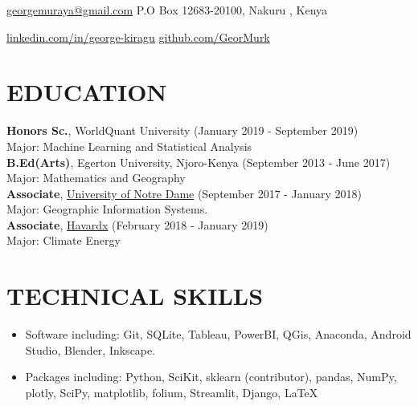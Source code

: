 \documentclass[line,margin,10pt]{res}
\begin{document}
 
\begin{resume}
\hoffset\centerline 
{\href{mailto:georgemuraya@gmail.com}{georgemuraya@gmail.com} \quad \quad \quad \quad \quad \quad \quad \quad \quad \quad \quad\quad \quad \quad \quad \quad \quad \quad \quad \quad \quad \quad  \quad    P.O Box 12683-20100, Nakuru , Kenya}
\hoffset\centerline 
{\hspace{0.05cm} \href{https://linkedin.com/in/george-kiragu}{linkedin.com/in/george-kiragu} \quad \quad \quad \quad \quad \quad \quad \quad \quad \quad \quad\quad \quad \quad \quad \quad \quad \quad \quad \quad \quad \quad  \quad \quad \quad  \quad \quad \quad   \quad \href{https://github.com/GeorMurk}{github.com/GeorMurk}}
 
{\vspace{-0.25cm}}

\section{EDUCATION} 
\textbf{Honors Sc.}, WorldQuant University \hfill (January 2019 - September 2019)\\
Major: Machine Learning and Statistical Analysis \\
\textbf{B.Ed(Arts)}, Egerton University, Njoro-Kenya \hfill (September 2013 - June 2017)\\
Major: Mathematics and Geography \\ 
\textbf{Associate}, \href{https://edge.edx.org/courses/course-v1:NotreDame+GIS000+0000/courseware}{University of Notre Dame} \hfill (September 2017 - January 2018)\\
Major: Geographic Information Systems. \\
\textbf{Associate}, \href{https://courses.edx.org/courses/course-v1:HarvardX+SPU29x+3T2016/course/}{Havardx} \hfill (February 2018 - January 2019)\\
Major: Climate Energy \\

\section{TECHNICAL SKILLS} 
\begin{itemize}[leftmargin=-2pt] \itemsep -2pt
\item [] Software including: Git, SQLite, Tableau, PowerBI, QGis, Anaconda, Android Studio, Blender, Inkscape.
\item []Packages including:  Python, SciKit, sklearn (contributor), pandas, NumPy, plotly, SciPy, matplotlib, folium, Streamlit, Django, \LaTeX\
\end{itemize}
{\vspace{-0.25cm}}


\end{resume}
\end{document}
